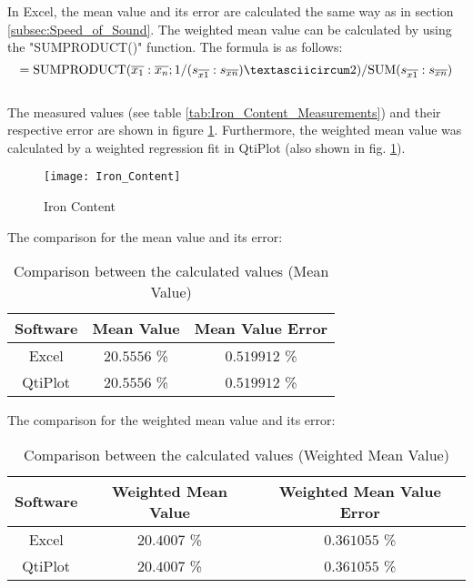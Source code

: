 In Excel, the mean value and its error are calculated the same way as in section \ref{subsec:Speed_of_Sound}. The weighted mean value can be calculated by using the "SUMPRODUCT()" function. The formula is as follows:
\[
=\text{SUMPRODUCT}(\overline{x_1}:\overline{x_n};1/(s_{\overline{x1}}:s_{\overline{xn}})\textasciicircum 2)/\text{SUM}(s_{\overline{x1}}:s_{\overline{xn}})
\]
\\
The measured values (see table \ref{tab:Iron_Content_Measurements}) and their respective error are shown in figure \ref{fig:Iron_Content}. Furthermore, the weighted mean value was calculated by a weighted regression fit in QtiPlot (also shown in fig. \ref{fig:Iron_Content}).
\begin{figure}[H]
	\centering
	\texttt{[image: Iron\_Content]}
	\caption{Iron Content}
	\label{fig:Iron_Content}
\end{figure}
The comparison for the mean value and its error:
\begin{table}[H]
	\centering
	\renewcommand{\arraystretch}{1.2}
	\begin{tabular}{c c c}
		\hline
		\textbf{Software} & \textbf{Mean Value} & \textbf{Mean Value Error} \\
		\hline
		Excel & $20.5556$ \% & $0.519912$ \% \\
		QtiPlot & $20.5556$ \% & $0.519912$ \% \\ \hline
	\end{tabular}
	\caption{Comparison between the calculated values (Mean Value)}
	\label{tab:Comparison_Iron_Content_Mean_Value}
\end{table}
\newpage
The comparison for the weighted mean value and its error:
\begin{table}[H]
	\centering
	\renewcommand{\arraystretch}{1.2}
	\begin{tabular}{c c c}
		\hline
		\textbf{Software} & \textbf{Weighted Mean Value} & \textbf{Weighted Mean Value Error} \\
		\hline
		Excel & $20.4007$ \% & $0.361055$ \% \\
		QtiPlot & $20.4007$ \% & $0.361055$ \% \\ \hline
	\end{tabular}
	\caption{Comparison between the calculated values (Weighted Mean Value)}
	\label{tab:Comparison_Iron_Content_Weighted_Mean_Value}
\end{table}
\newpage
